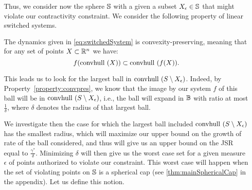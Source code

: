 \begin{center}
\end{center}


Thus, we consider now the sphere $\mathbb{S}$ with a given a subset $X_{\epsilon} \in \mathbb{S}$ that might violate our contractivity constraint. We consider the following property of linear switched systems.

\begin{property}\label{property:convpres}
The dynamics given in \eqref{eq:switchedSystem} is convexity-preserving, meaning that for any set of points $X \subset \mathbb{R}^n$ we have:
$$ f(\mbox{convhull }({X}))\subset \mbox{convhull }(f(X)). $$
\end{property}


This leads us to look for the largest ball in $\mbox{convhull } (S \setminus X_{\epsilon})$. Indeed, by Property~\ref{property:convpres}, we know that the image by our system $f$ of this ball will be in $\mbox{convhull } (S \setminus X_{\epsilon})$, i.e., the ball will expand in $\mathbb{B}$ with ratio at most $\frac{1}{\delta}$, where $\delta$ denotes the radius of that largest ball. 

We investigate then the case for which the largest ball included $\mbox{convhull } (S \setminus X_{\epsilon})$ has the smallest radius, which will maximize our upper bound on the growth of rate of the ball considered, and thus will give us an upper bound on the JSR equal to $\frac{\gamma^{*}}{\delta}$. Minimizing $\delta$ will then give us the worst case set for a given measure $\epsilon$ of points authorized to violate our constraint. This worst case will happen when the set of violating points on $\mathbb{S}$ is a spherical cap (see \ref{thm:mainSphericalCap} in the appendix). Let us define this notion.


